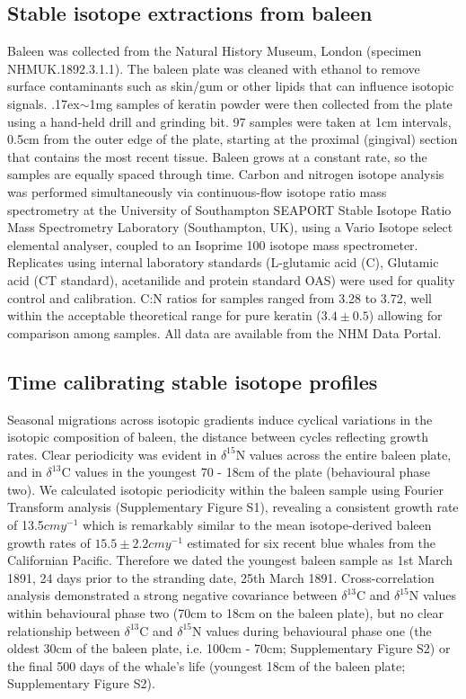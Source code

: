 \documentclass[a4paper,12pt]{article}
\begin{document}
\subsection{Stable isotope extractions from baleen}
Baleen was collected from the Natural History Museum, London (specimen NHMUK.1892.3.1.1). 
The baleen plate was cleaned with ethanol to remove surface contaminants such as skin/gum or other lipids that can influence isotopic signals. 
{\raise.17ex\hbox{$\scriptstyle\sim$}}1mg samples of keratin powder were then collected from the plate using a hand-held drill and grinding bit. 
97 samples were taken at 1cm intervals, 0.5cm from the outer edge of the plate, starting at the proximal (gingival) section that contains the most recent tissue. 
Baleen grows at a constant rate, so the samples are equally spaced through time\cite{best1996stable}. 
Carbon and nitrogen isotope analysis was performed simultaneously via continuous-flow isotope ratio mass spectrometry at the University of Southampton SEAPORT Stable Isotope Ratio Mass Spectrometry Laboratory (Southampton, UK), using a Vario Isotope select elemental analyser, coupled to an Isoprime 100 isotope mass spectrometer. 
Replicates using internal laboratory standards (L-glutamic acid (C), Glutamic acid (CT standard), acetanilide and protein standard OAS) were used for quality control and calibration. 
C:N ratios for samples ranged from 3.28\text{\textperthousand} to 3.72\text{\textperthousand}, well within the acceptable theoretical range for pure keratin ($3.4\pm0.5$) allowing for comparison among samples\cite{hobson1998stable}. 
All data are available from the NHM Data Portal\cite{data-set}.
 
\subsection{Time calibrating stable isotope profiles}
Seasonal migrations across isotopic gradients induce cyclical variations in the isotopic composition of baleen, the distance between cycles reflecting growth rates\cite{hobson1998stable,busquets2017estimating}. 
Clear periodicity was evident in $\delta^{15}$N values across the entire baleen plate, and in $\delta^{13}$C values in the youngest 70 - 18cm of the plate (behavioural phase two). 
We calculated isotopic periodicity within the baleen sample using Fourier Transform analysis\cite{cardona2017temporal} (Supplementary Figure S1), revealing a consistent growth rate of 13.5$cmy^{-1}$ which is remarkably similar to the mean isotope-derived baleen growth rates of $15.5 \pm 2.2cmy^{-1}$ estimated for six recent blue whales from the Californian Pacific\cite{busquets2017estimating}.  
Therefore we dated the youngest baleen sample as 1st March 1891, 24 days prior to the stranding date, 25th March 1891. 
Cross-correlation analysis demonstrated a strong negative covariance between $\delta^{13}$C and $\delta^{15}$N values within behavioural phase two (70cm to 18cm on the baleen plate), but no clear relationship between $\delta^{13}$C and $\delta^{15}$N values during behavioural phase one (the oldest 30cm of the baleen plate, i.e. 100cm - 70cm; Supplementary Figure S2) or the final 500 days of the whale's life (youngest 18cm of the baleen plate; Supplementary Figure S2).
 
\end{document}
